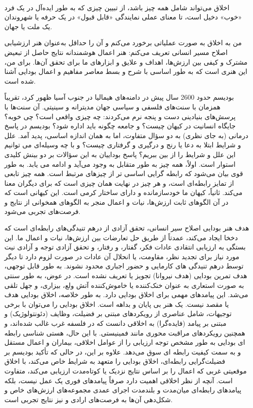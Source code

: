 \paragraph{}
اخلاق می‌تواند شامل همه چیز باشد، از تبیین چیزی که به طور ایده‌آل در یک فرد «خوب» دخیل است، تا معنای عملی نمایندگی «قابل قبول» در یک حرفه یا شهروندان یک ملت یا جهان.

من به اخلاق به صورت عملیاتی برخورد می‌کنم و آن را حداقل به‌عنوان هنر ارزشیابی اصلاح مسیر انسانی تعریف می‌کنم: هنر اعمال هوشمندانه نتایج حاصل از تبعیض مشترک و کیفی بین ارزش‌ها، اهداف و علایق و ابزارهای ما برای تحقق آن‌ها.
برای من، این هنری است که به طور اساسی با شرح و بسط معاصر مفاهیم و اعمال بودایی آشنا شده است.

بودیسم حدود 2600 سال پیش در دامنه‌های هیمالیا در جنوب آسیا ظهور کرد، تقریباً همزمان با سنت‌های فلسفی و سیاسی جهان مدیترانه و سینیتی.
آن سنت‌ها با پرسش‌های بنیادینی دست و پنجه نرم می‌کردند: چه چیزی واقعی است؟ چی خوبه؟ جایگاه انسانیت در کیهان چیست؟ و جامعه چگونه باید اداره شود؟ بودیسم در پاسخ درمانی (به جای نظری) به دو سؤال متفاوت، اما به همان اندازه اساسی، پدید آمد.
علل و شرایط ابتلا به دعا یا رنج و درگیری و گرفتاری چیست؟ و با چه وسیله‌ای می توانیم این علل و شرایط را از بین ببریم؟ پاسخ بوداییان به این سؤالات بر دو بینش کلیدی استوار است.
اولاً، همه چیز به طور متقابل به وجود می‌آید و ادامه می یابد.
به طور قوی بیان می‌شود که رابطه گرایی اساسی تر از چیزهای مرتبط است.
همه چیز تابعی از تمایز رابطه‌ای است، و هر چیز در نهایت همان چیزی است که برای دیگران معنا می‌کند.
ثانیاً، کیهان ما خودسازمانده و دارای ساختار کرمی است.
این کیهانی است که در آن الگوهای ثابت ارزش‌ها، نیات و اعمال منجر به الگوهای همخوانی از نتایج و فرصت‌های تجربی می‌شود.

هدف هنر بودایی اصلاح سیر انسانی، تحقق آزادی از درهم تنیدگی‌های رابطه‌ای است که دخخا ایجاد می‌کند، عمدتاً از طریق حل تعارضات بین ارزش‌ها، نیات و اعمال ما.
این بستگی به ارزیابی انتقادی عادات فکر، گفتار، و رفتار، و تحقق آزادی توجه و آزادی نیت مورد نیاز برای تجدید نظر، مقاومت، یا انحلال آن عادات در صورت لزوم دارد تا دیگر توسط درهم تنیدگی های کارمایی و حضور اجباری محدود نشوند.
به طور قابل توجهی، هدف تمرین بودایی (هدف نیروانا) تجویز یا تعریف نشده است.
در عوض، به طور سنتی به صورت استعاری به عنوان خنک‌کننده یا خاموش‌کننده آتش ولع، بیزاری، و جهل تلقی می‌شد.
این پیامدهای مهمی برای اخلاق بودایی دارد.
به طور خلاصه، اخلاق بودایی هدف یا مقصد نیست.
یک هنر بی پایان و بداهه است.
اخلاق بودایی را می‌توان با برخی توجیهات، شامل عناصری از رویکردهای مبتنی بر فضیلت، وظایف (دئونتولوژیک) و مبتنی بر پیامد (فایده‌گرا) به اخلاقی دانست که در فلسفه غرب غالب شده‌اند، و همچنین رویکردهای مراقبت محوری مانند فمینیستی.
با این حال، هستی شناسی رابطه ای بودایی به طور مشخص توجه ارزیابی را از عوامل اخلاقی، بیماران و اعمال مستقل و به سمت کیفیت رابطه ای سوق می‌دهد.
علاوه بر این، در حالی که تأکید بودیسم بر فضیلت‌گرایی رابطه‌ای، اخلاق بودایی را متعهد به شرایط خاص می‌کند، با اخلاق موقعیتی غربی که اعمال را بر اساس نتایج نزدیک یا کوتاه‌مدت ارزیابی می‌کند، متفاوت است.
آنچه از نظر اخلاقی اهمیت دارد صرفاً پیامدهای فوری یک عمل نیست، بلکه پیامدهای رابطه‌ای میان‌مدت و بلندمدت اجرای عمدی مجموعه‌های ارزش‌های خاص و شکل‌دهی آن‌ها به فرصت‌های ارادی و نیز نتایج تجربی است.


